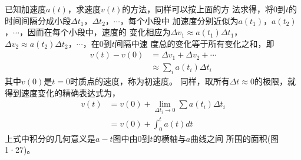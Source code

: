     已知加速度$a(t)$，求速度$v(t)$的方法，同样可以按上面的方
法求得，将0到$t$的时间间隔分成小段$\Delta t_1$，$\Delta t_2$，$\cdots$，每个小段中
加速度分别近似为$a(t_1)$，$a(t_2)$，$\cdots$，因而在每个小段中，速度的
变化相应为$\Delta v_1\approx a(t_1)\Delta t_1$，$\Delta v_2\approx a(t_2)\Delta t_2$，$\cdots$，在0到$t$间隔中速
度总的变化等于所有变化之和，即
\begin{equation}\label{eqn:01.11.05}
    \begin{aligned}
        v(t)-v(0) &=\Delta v_{1}+\Delta v_{2}+\cdots \\
        & \approx \sum_{i} a\left(t_{i}\right) \Delta t_{i}
    \end{aligned}
\end{equation}
其中$v(0)$是$t=0$时质点的速度，称为初速度。
同样，取所有$\Delta t\approx 0$的极限，就得到速度变化的精确表达式为，
\begin{equation}\label{eqn:01.11.06}
    \begin{aligned}
        v(t) &=v(0)+\lim _{\Delta t_{i} \rightarrow 0} \sum a(t_{i}) \Delta t_{i} \\
        &=v(0)+\int_{0}^{t} a(t) d t
    \end{aligned}
\end{equation}
上式中积分的几何意义是$a-t$图中由0到$t$的横轴与$a$曲线之间
所围的面积(图1·27)。

